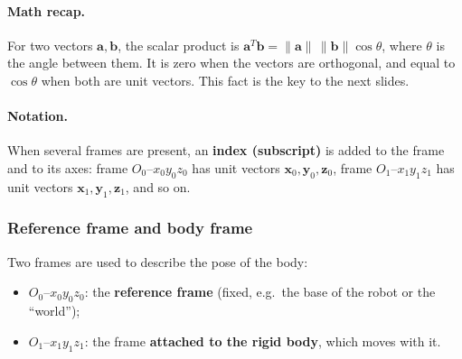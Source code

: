 \paragraph{Math recap.} For two vectors $\mathbf{a},\mathbf{b}$, the scalar product is $\mathbf{a}^T\mathbf{b}=\|\mathbf{a}\|\,\|\mathbf{b}\|\cos\theta$, where $\theta$ is the angle between them. It is zero when the vectors are orthogonal, and equal to $\cos\theta$ when both are unit vectors. This fact is the key to the next slides.

\paragraph{Notation.} When several frames are present, an \textbf{index (subscript)} is added to the frame and to its axes: frame $O_0$--$x_0y_0z_0$ has unit vectors $\mathbf{x}_0,\mathbf{y}_0,\mathbf{z}_0$, frame $O_1$--$x_1y_1z_1$ has unit vectors $\mathbf{x}_1,\mathbf{y}_1,\mathbf{z}_1$, and so on.

\subsubsection{Reference frame and body frame}

Two frames are used to describe the pose of the body:
\begin{itemize}
    \item $O_0$--$x_0y_0z_0$: the \textbf{reference frame} (fixed, e.g.\ the base of the robot or the ``world'');
    \item $O_1$--$x_1y_1z_1$: the frame \textbf{attached to the rigid body}, which moves with it.
\end{itemize}

\begin{center}
\end{center}

